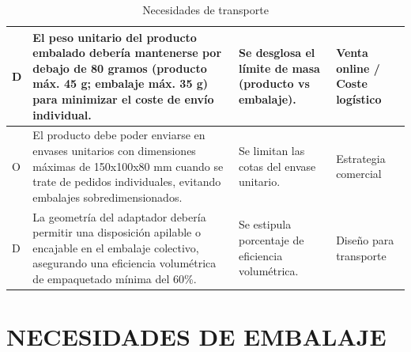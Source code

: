 \documentclass[11pt,a4paper]{article}
\begin{document}
\begin{table}[H]
\begin{tabular}{|p{2.8cm}|p{5.5cm}|p{2.5cm}|p{3.0cm}|}
\hline
D & El peso unitario del producto embalado debería mantenerse por debajo de 80 gramos (producto máx. 45 g; embalaje máx. 35 g) para minimizar el coste de envío individual. & Se desglosa el límite de masa (producto vs embalaje). & Venta online / Coste logístico \\
\hline
O & El producto debe poder enviarse en envases unitarios con dimensiones máximas de 150x100x80 mm cuando se trate de pedidos individuales, evitando embalajes sobredimensionados. & Se limitan las cotas del envase unitario. & Estrategia comercial \\
\hline
D & La geometría del adaptador debería permitir una disposición apilable o encajable en el embalaje colectivo, asegurando una eficiencia volumétrica de empaquetado mínima del 60\%. & Se estipula porcentaje de eficiencia volumétrica. & Diseño para transporte \\
\hline
\end{tabular}
\caption{Necesidades de transporte}
\end{table}
\newpage

\section{NECESIDADES DE EMBALAJE}

\vspace{0.5cm}
\end{document}
